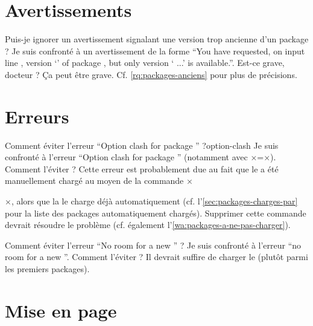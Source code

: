 \section{Avertissements}
\label{sec:avertissements}

\begin{dbfaq}{Puis-je ignorer un avertissement signalant une version trop
    ancienne d'un package ?}{}
  Je suis confronté à un avertissement de la forme \enquote{You have requested,
    on input line , version `' of package
    , but only version ` ...'
    is available.}. Est-ce grave, docteur ?
  \tcblower
  Ça peut être grave. Cf. \vref{rq:packages-anciens} pour plus de précisions.
\end{dbfaq}

\section{Erreurs}
\label{sec:erreurs}

\begin{dbfaq}{Comment éviter l'erreur \enquote{Option clash for package
      } ?}{option-clash}
  Je suis confronté à l'erreur \enquote{Option clash for package
    } (notamment avec ×=×). Comment
  l'éviter ?
  \tcblower
  Cette erreur est probablement due au fait que le  a été
  manuellement chargé au moyen de la commande
  ×\usepackage[...]{×\meta{package}×}×, alors que la \yatcl{} le charge déjà
  automatiquement (cf. l'\vref{sec:packages-charges-par} pour la liste des
  packages automatiquement chargés). Supprimer cette commande devrait résoudre
  le problème (cf. également l'\vref{wa:packages-a-ne-pas-charger}).
\end{dbfaq}

\begin{dbfaq}{Comment éviter l'erreur \enquote{No room for a new
      \protect{}} ?}{}
  Je suis confronté à l'erreur \enquote{no room for a new
    }. Comment l'éviter ?
  \tcblower
  Il devrait suffire de charger le  (plutôt parmi les
  premiers packages).
\end{dbfaq}

\section{Mise en page}
\label{sec:mise-en-page}

